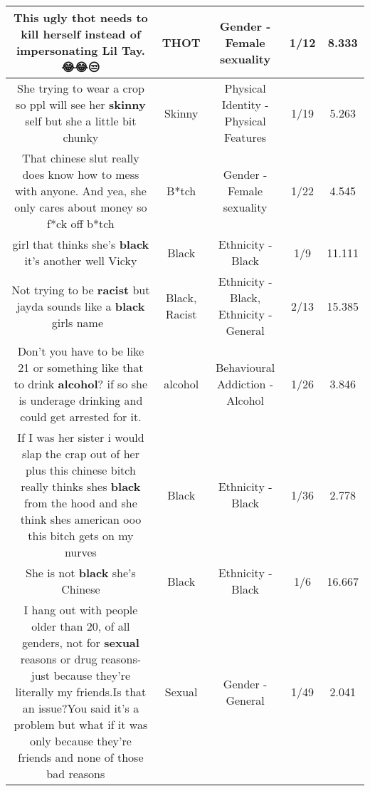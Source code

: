 \documentclass[11pt]{article}
\newlength\mylength
\begin{document}
\begin{center}
\begin{longtable}{|C{.65\mylength}|C{.30\mylength}|C{.12\mylength}|C{.12\mylength}|C{.12\mylength}|}
  \small This ugly \textbf{thot} needs to kill herself instead of impersonating Lil Tay.😂😂😒\normalsize   & THOT & Gender - Female sexuality & 1/12 & 8.333 \\  \hline
  \small She trying to wear a crop so ppl will see her \textbf{skinny} self but she a little bit chunky\normalsize   & Skinny & Physical Identity - Physical Features & 1/19 & 5.263 \\  \hline
  \small That chinese slut really does know how to mess with anyone. And yea, she only cares about money so f*ck off b*tch\normalsize   & B*tch & Gender - Female sexuality & 1/22 & 4.545 \\  \hline
  \small girl that thinks she's \textbf{black} it's another well Vicky\normalsize   & Black & Ethnicity - Black & 1/9 & 11.111 \\  \hline
  \small Not trying to be \textbf{racist} but jayda sounds like a \textbf{black} girls name🤷‍♀️\normalsize   & Black, Racist & Ethnicity - Black, Ethnicity - General & 2/13 & 15.385 \\  \hline
  \small Don't you have to be like 21 or something like that to drink \textbf{alcohol}? if so she is underage drinking and could get arrested for it.\normalsize   & alcohol & Behavioural Addiction - Alcohol & 1/26 & 3.846 \\  \hline
  \small If I was her  sister i would slap the crap out of her plus this chinese bitch really thinks shes \textbf{black} from the hood and she think shes american ooo this bitch gets on my nurves\normalsize   & Black & Ethnicity - Black & 1/36 & 2.778 \\  \hline
  \small She is not \textbf{black} she's Chinese\normalsize   & Black & Ethnicity - Black & 1/6 & 16.667 \\  \hline
  \small I hang out with people older than 20, of all genders, not for \textbf{sexual} reasons or drug reasons- just because they're literally my friends.Is that an issue?You said it's a problem but what if it was only because they're friends and none of those bad reasons 🤷‍♀️\normalsize   & Sexual & Gender - General & 1/49 & 2.041 \\  \hline

\end{longtable}
\end{center}
\end{document}
